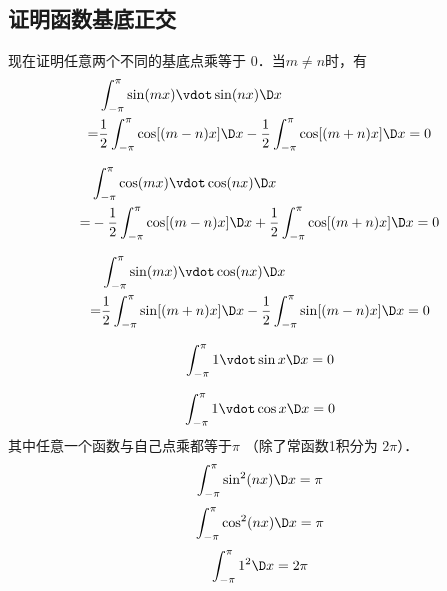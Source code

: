 \subsection{证明函数基底正交}

现在证明任意两个不同的基底点乘等于 0．当$m \ne n$时，有
\begin{equation}\begin{aligned}
&\int_{ - \pi }^\pi  {\sin(mx) \vdot \sin(nx) \D x} \\
 = &\frac{1}{2}\int_{ - \pi }^\pi  {\cos [ {(m - n)x} ]\D x}  - \frac{1}{2}\int_{ - \pi }^\pi  {\cos [ {(m + n)x} ]\D x}  = 0
\end{aligned}\end{equation}

\begin{equation}\begin{aligned}
&\int_{ - \pi }^\pi  {\cos(mx) \vdot \cos(nx) \D x} \\
 =  &- \frac{1}{2}\int_{ - \pi }^\pi  {\cos [ {(m - n)x} ]\D x}  + \frac{1}{2}\int_{ - \pi }^\pi  {\cos [ {(m + n)x} ]\D x}  = 0
\end{aligned}\end{equation}

\begin{equation}\begin{aligned}
&\int_{ - \pi }^\pi  {\sin(mx) \vdot \cos(nx) \D x}\\
= &\frac{1}{2}\int_{ - \pi }^\pi  {\sin [ {(m + n)x} ]\D x}  - \frac{1}{2}\int_{ - \pi }^\pi  {\sin [ {(m - n)x} ]\D x} = 0
\end{aligned}\end{equation}

\begin{equation}
\int_{ - \pi }^\pi  {1 \vdot \sin x \D x}  = 0
\end{equation}

\begin{equation}
\int_{ - \pi }^\pi  {1 \vdot \cos x \D x}  = 0\\
\end{equation}
其中任意一个函数与自己点乘都等于$\pi $ （除了常函数1积分为 $2\pi$）．
\begin{equation}
\int_{ - \pi }^\pi {{{\sin }^2}(nx) \D x} = \pi
\end{equation}
\begin{equation}
\int_{ - \pi }^\pi {{{\cos }^2}(nx) \D x} = \pi
\end{equation}
\begin{equation}
\int_{ - \pi }^\pi {{1^2}\D x} = 2\pi
\end{equation}

